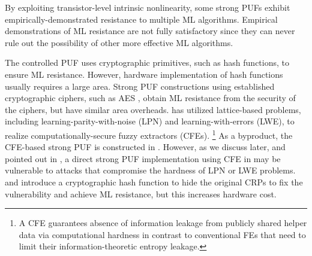 By exploiting transistor-level intrinsic nonlinearity, some strong PUFs \cite{kumar2014design, zhuang2019strong} exhibit empirically-demonstrated resistance to multiple ML algorithms. 
Empirical demonstrations of ML resistance are not fully satisfactory since they can never rule out the possibility of other more effective ML algorithms. 

The controlled PUF \cite{gassend2008controlled} uses cryptographic primitives, such as hash functions, to ensure ML resistance. 
However, hardware implementation of hash functions usually requires a large area.
Strong PUF constructions using established cryptographic ciphers, such as AES \cite{bhargava2014efficient}, obtain ML resistance from the security of the ciphers, but have similar area overheads. 
\cite{fuller2013computational} has utilized lattice-based problems, including learning-parity-with-noise (LPN) and learning-with-errors (LWE), to realize computationally-secure fuzzy extractors (CFEs).
\footnote{A CFE guarantees absence of information leakage from publicly shared helper data via computational hardness in contrast to conventional FEs that need to limit their information-theoretic entropy leakage.} 
As a byproduct, the CFE-based strong PUF is constructed in \cite{herder2017trapdoor,jin2017fpga}.
However, as we discuss later, and pointed out in \cite{herder2017trapdoor,jin2017fpga}, a direct strong PUF implementation using CFE in \cite{fuller2013computational} may be vulnerable to attacks that compromise the hardness of LPN or LWE problems. 
\cite{herder2017trapdoor} and \cite{jin2017fpga} introduce a cryptographic hash function to hide the original CRPs to fix the vulnerability and achieve ML resistance, but this increases hardware cost.


